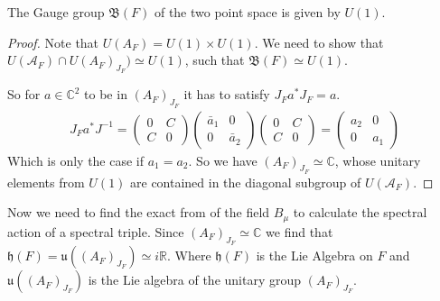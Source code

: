 \begin{proposition}
    The Gauge group $\mathfrak{B}(F)$ of the two point space is given by
    $U(1)$.
\end{proposition}
\begin{proof}
    Note that $U(A_F) = U(1) \times U(1)$. We need to show that
    $U(\mathcal{A}_F)
    \cap U(A_F)_{J_F}) \simeq U(1)$, such that $\mathfrak{B}(F)
    \simeq U(1)$.\newline

    So for $a \in \mathbb{C}^2$ to be in $(A_F)_{J_F}$ it has
    to satisfy $J_F a^* J_F = a$.
    \begin{align}
        J_F a^* J^{-1} =
        \begin{pmatrix}0&C\\C&0\end{pmatrix}
            \begin{pmatrix}\bar{a}_1&0\\0&\bar{a}_2\end{pmatrix}
        \begin{pmatrix}0&C\\C&0\end{pmatrix}
            =
            \begin{pmatrix}a_2&0\\0&a_1\end{pmatrix}
    \end{align}
    Which is only the case if $a_1 = a_2$. So we have
    $(A_F)_{J_F} \simeq \mathbb{C}$, whose unitary elements
    from $U(1)$ are contained in the diagonal subgroup of
    $U(\mathcal{A}_F)$.
\end{proof}

Now we need to find the exact from of the field $B_\mu$ to calculate the
spectral action of a spectral triple. Since $(A_F)_{J_F} \simeq
\mathbb{C}$ we find that $\mathfrak{h}(F) = \mathfrak{u}((A_F)_{J_F})
\simeq i\mathbb{R}$. Where $\mathfrak{h}(F)$ is the Lie Algebra on $F$
and $\mathfrak{u}((A_F)_{J_F})$ is the Lie algebra of the unitary group
$(A_F)_{J_F}$.\newline

